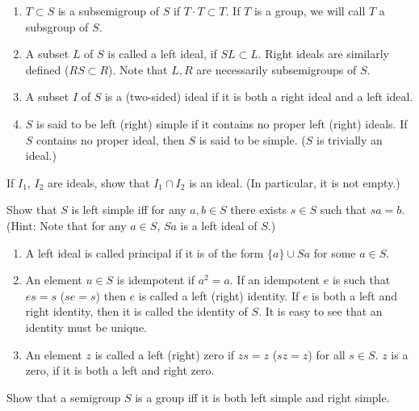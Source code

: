 \begin{definition}   \label{defn:2.3}
\begin{enumerate}
\item[(1)] $T \subset S$ is a subsemigroup of $S$ if
     $T \cdot T \subset T$.  If $T$ is a group, we will call
     $T$ a subsgroup of $S$.

\item[(2)] A subset $L$ of $S$ is called a left ideal, if
     $SL \subset L$.  Right ideals are similarly defined
     ($RS \subset R$).  Note that $L,R$ are necessarily subsemigroups
     of $S$.

\item[(3)] A subset $I$ of $S$ is a (two-sided) ideal if it is both a
     right ideal and a left ideal.

\item[(4)] $S$ is said to be left (right) simple if it contains no
     proper left (right) ideals.  If $S$ contains no proper ideal,
     then $S$ is said to be simple.  ($S$ is trivially an ideal.)
\end{enumerate}
\end{definition}

  If $I_1$, $I_2$ are ideals, show that
     $I_1 \cap I_2$ is an ideal.  (In particular, it is not empty.)

  Show that $S$ is left simple iff for any
     $a,b \in S$ there exists $s \in S$ such that $sa = b$.
     (Hint: Note that for any $a \in S$, $Sa$ is a left ideal of $S$.)

\begin{enumerate}
\item[(5)] A left ideal is called principal if it is of the form
     $\{a\} \cup Sa$ for some $a \in S$.

\item[(6)] An element $u \in S$ is idempotent if $a^2 = a$.  If an
     idempotent $e$ is such that $es = s$ ($se = s$) then $e$ is
     called a left (right) identity.  If $e$ is both a left and right
     identity, then it is called the identity of $S$.  It is easy to 
     see that an identity must be unique.

\item[(7)] An element $z$ is called a left (right) zero if $zs = z$
     ($sz = z$) for all $s \in S$.  $z$ is a zero, if it is both a left
     and right zero.
\end{enumerate}

  Show that a semigroup $S$ is a group iff it is
     both left simple and right simple.

